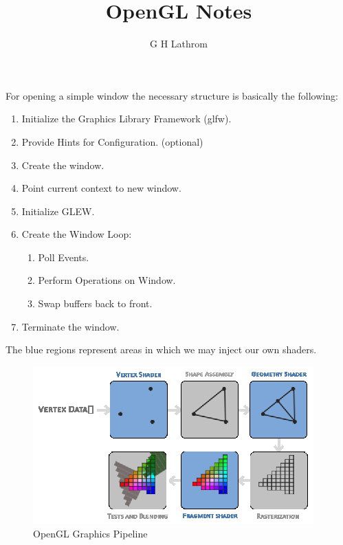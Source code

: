\documentclass[12pt,letterpaper]{article}
\title{OpenGL Notes}
\author{G H Lathrom}
\begin{document}
\maketitle


\pagestyle{fancy}
\fancyhf{}
\chead{}
\fancyfoot[C]{\thepage}
\renewcommand{\headrulewidth}{.5pt}

For opening a simple window the necessary structure is basically the following:
\begin{enumerate}
    \item Initialize the Graphics Library Framework (glfw).
    \item Provide Hints for Configuration. (optional)
    \item Create the window.
    \item Point current context to new window.
    \item Initialize GLEW.
    \item Create the Window Loop:
        \begin{enumerate}
            \item Poll Events.
            \item Perform Operations on Window.
            \item Swap buffers back to front.
        \end{enumerate}
    \item Terminate the window.
\end{enumerate}


\cite{babyrudin}

The blue regions represent areas in which we may inject our own shaders.

\begin{figure}[htpb]
    \begin{center}
        \begin{minipage}[t]{.8\textwidth}
            \includegraphics[width=\textwidth]{images/pipeline.eps}
        \end{minipage}
    \end{center}
    \caption{OpenGL Graphics Pipeline}
    \label{fig:pipeline}
\end{figure}




\end{document}
